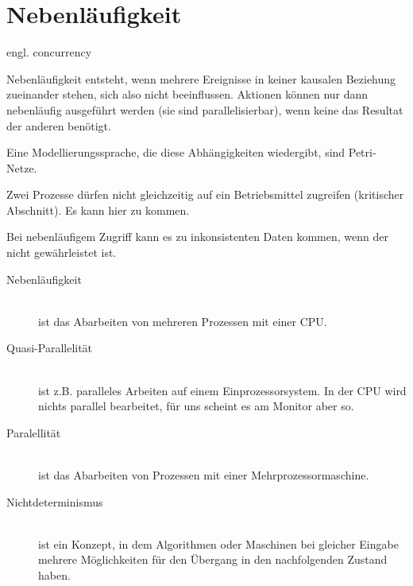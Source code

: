 \section{Nebenläufigkeit}

\begin{answer}
engl. concurrency

Nebenläufigkeit entsteht, wenn mehrere Ereignisse in keiner kausalen Beziehung zueinander stehen, sich also nicht beeinflussen. Aktionen können nur dann nebenläufig ausgeführt werden (sie sind parallelisierbar), wenn keine das Resultat der anderen benötigt.

Eine Modellierungssprache, die diese Abhängigkeiten wiedergibt, sind Petri-Netze.
\end{answer}

\begin{answer}
Zwei Prozesse dürfen nicht gleichzeitig auf ein Betriebsmittel zugreifen (kritischer Abschnitt). Es kann hier zu  kommen.

Bei nebenläufigem Zugriff kann es zu inkonsistenten Daten kommen, wenn der  nicht gewährleistet ist.
\end{answer}

\begin{answer}
\begin{description}
\item[Nebenläufigkeit] \hfill \\ ist das Abarbeiten von mehreren Prozessen mit einer CPU. 
\item[Quasi-Parallelität]  \hfill \\ ist z.B. paralleles Arbeiten auf einem Einprozessorsystem. In der CPU wird nichts parallel bearbeitet, für uns scheint es am Monitor aber so.
\item[Paralellität] \hfill \\  ist das Abarbeiten von Prozessen mit einer Mehrprozessormaschine.
\item[Nichtdeterminismus] \hfill \\  ist ein Konzept, in dem Algorithmen oder Maschinen bei gleicher Eingabe mehrere Möglichkeiten für den Übergang in den nachfolgenden Zustand haben. 
\end{description}
\end{answer}

